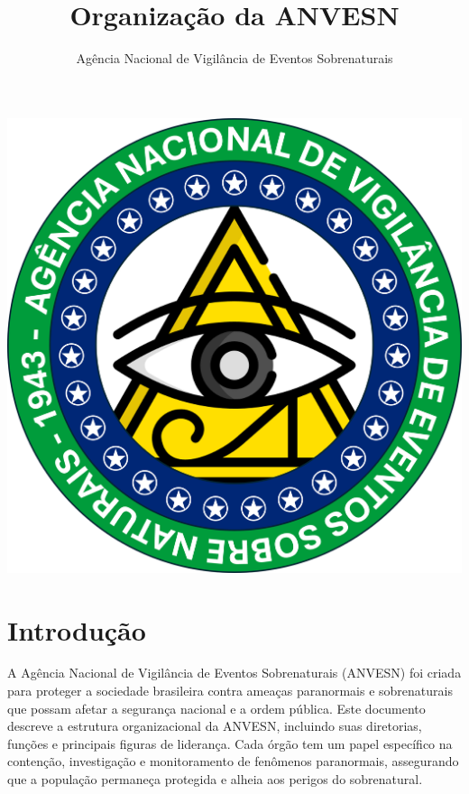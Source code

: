 \documentclass{book}
\title{Organização da ANVESN}
\author{Agência Nacional de Vigilância de Eventos Sobrenaturais}
\date{}
\begin{document}
\maketitle


\begin{center}
\newpage
\vspace*{\fill}
\includegraphics[scale=.9]{imagens/ANVESN_LOGO.png}
\vspace*{\fill}
\newpage
\end{center}

\frontmatter


\chapter*{Introdução}
A Agência Nacional de Vigilância de Eventos Sobrenaturais (ANVESN) foi criada para proteger a sociedade brasileira contra ameaças paranormais e sobrenaturais que possam afetar a segurança nacional e a ordem pública. Este documento descreve a estrutura organizacional da ANVESN, incluindo suas diretorias, funções e principais figuras de liderança. Cada órgão tem um papel específico na contenção, investigação e monitoramento de fenômenos paranormais, assegurando que a população permaneça protegida e alheia aos perigos do sobrenatural.

\tableofcontents
\end{document}
